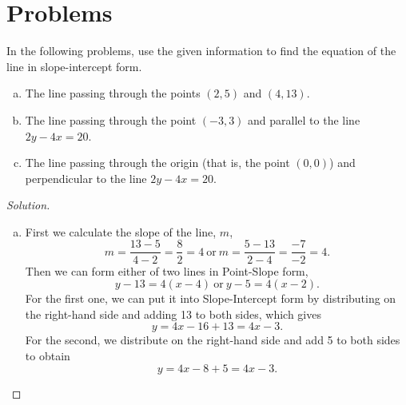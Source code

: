 \documentclass[12pt]{amsart}
\begin{document}
\section{Problems}

\begin{thm}[16 Points]\label{ex5}
  In the following problems, use the given information to find the equation of the line in slope-intercept form.
  \begin{enumerate}[(a)]
  \item
    The line passing through the points $(2,5)$ and $(4,13)$.
  \item
    The line passing through the point $(-3, 3)$ and parallel to the line $2y - 4x = 20$.
  \item
    The line passing through the origin (that is, the point $(0,0)$) and perpendicular to the line $2y - 4x = 20$.
  \end{enumerate}
  \begin{proof}[Solution]
    \begin{enumerate}[(a)]
    \item
      First we calculate the slope of the line, $m$,
      $$m = \frac{13 - 5}{4 - 2} = \frac{8}{2} = 4\ \text{or}\ m = \frac{5 - 13}{2 - 4} = \frac{-7}{-2} = 4.$$
      Then we can form either of two lines in Point-Slope form,
      $$y - 13 = 4(x - 4)\ \text{or}\ y - 5 = 4(x - 2).$$
      For the first one, we can put it into Slope-Intercept form by distributing on the right-hand side and adding 13 to both sides, which gives
      $$y = 4x - 16 + 13 = 4x - 3.$$
      For the second, we distribute on the right-hand side and add 5 to both sides to obtain
      $$y = 4x - 8 + 5 = 4x - 3.$$


\end{enumerate}
\end{proof}
\end{thm}
\end{document}
